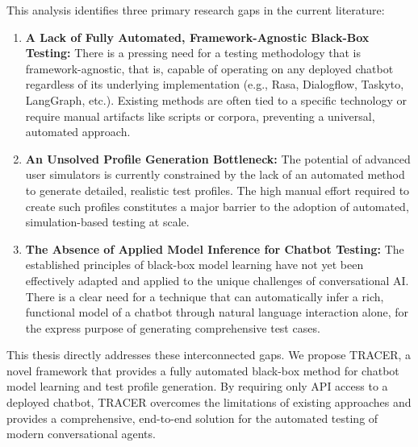 This analysis identifies three primary research gaps in the current literature:
\begin{enumerate}
    \item \textbf{A Lack of Fully Automated, Framework-Agnostic Black-Box Testing:}
      There is a pressing need for a testing methodology
      that is framework-agnostic, that is,
      capable of operating on any deployed chatbot
      regardless of its underlying implementation
      (e.g., Rasa, Dialogflow, Taskyto, LangGraph, etc.).
      Existing methods are often tied to a specific technology
      or require manual artifacts like scripts or corpora,
      preventing a universal, automated approach.

    \item \textbf{An Unsolved Profile Generation Bottleneck:}
      The potential of advanced user simulators
      is currently constrained by the lack of an automated method
      to generate detailed, realistic test profiles.
      The high manual effort required to create such profiles
      constitutes a major barrier
      to the adoption of automated, simulation-based testing at scale.

    \item \textbf{The Absence of Applied Model Inference for Chatbot Testing:}
      The established principles of black-box model learning
      have not yet been effectively adapted and applied
      to the unique challenges of conversational \ac{AI}.
      There is a clear need for a technique
      that can automatically infer a rich, functional model of a chatbot
      through natural language interaction alone,
      for the express purpose of generating comprehensive test cases.

\end{enumerate}

This thesis directly addresses these interconnected gaps.
We propose \ac{TRACER}, a novel framework
that provides a fully automated black-box method
for chatbot model learning and test profile generation.
By requiring only \ac{API} access to a deployed chatbot,
\ac{TRACER} overcomes the limitations of existing approaches
and provides a comprehensive, end-to-end solution
for the automated testing of modern conversational agents.

